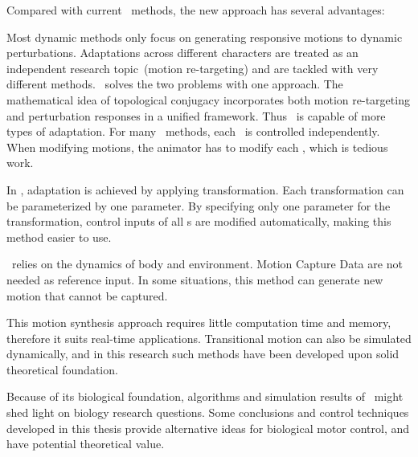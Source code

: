Compared with current \cms\ methods, the new approach has several advantages:
\begin{enumerate}
Most dynamic methods only focus on generating responsive motions to dynamic perturbations.
Adaptations across different characters are treated as an independent research topic~(motion re-targeting) and are tackled with very different methods.
{\moit}\ solves the two problems with one approach.
The mathematical idea of topological conjugacy  incorporates both motion re-targeting and  perturbation responses  in a unified framework.
Thus {\moit}\ is capable of more types of adaptation.
For many \cms\ methods, each \dof ~is controlled independently.
When modifying motions, the animator has to modify each \dof, which is tedious work.

In {\moit}, adaptation is achieved by applying transformation.
Each transformation can be parameterized by one parameter. 
By specifying only one parameter for the transformation, control inputs of all {\dof}s are modified automatically, making this method easier to use.

{\moit}\ relies on the dynamics of body and environment.
Motion Capture Data are not needed as reference input.
In some situations, this method can generate new motion that cannot be captured.


This motion synthesis approach requires little computation time and memory, therefore it suits real-time applications.
Transitional motion can also be simulated dynamically, and in this research such methods have been developed upon solid theoretical foundation.

\end{enumerate}

Because of its biological foundation,
algorithms and simulation results of {\moit}\  might shed light on biology research questions.
Some conclusions and control techniques developed in this thesis provide alternative ideas for biological motor control, and have potential theoretical value.

